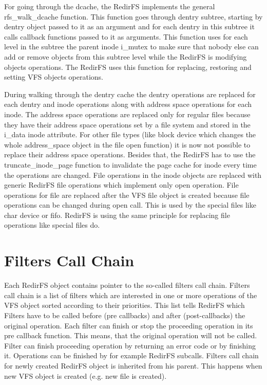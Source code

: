 \documentclass[oneside, 11pt, a4]{article}
\begin{document}
For going through the dcache, the RedirFS implements the general rfs\_walk\_dcache
function. This function goes through dentry subtree, starting by dentry object
passed to it as an argument and for each dentry in this subtree it calls
callback functions passed to it as arguments. This function uses for each level
in the subtree the parent inode i\_mutex to make sure that nobody else can add or
remove objects from this subtree level while the RedirFS is modifying objects
operations. The RedirFS uses this function for replacing, restoring and setting
VFS objects operations.

During walking through the dentry cache the dentry operations are replaced for
each dentry and inode operations along with address space operations for each
inode. The address space operations are replaced only for regular files because
they have their address space operations set by a file system and stored in the
i\_data inode attribute. For other file types (like block device which changes
the whole address\_space object in the file open function) it is now not possible
to replace their address space operations. Besides that, the RedirFS has to use
the truncate\_inode\_page function to invalidate the page cache for inode every
time the operations are changed. File operations in the inode objects are
replaced with generic RedirFS file operations which implement only open
operation. File operations for file are replaced after the VFS file object is
created because file operations can be changed during open call. This is used by
the special files like char device or fifo. RedirFS is using the same principle
for replacing file operations like special files do.

\section{Filters Call Chain}
Each RedirFS object contains pointer to the so-called filters call chain.
Filters call chain is a list of filters which are interested in one or more
operations of the VFS object sorted according to their priorities. This list
tells RedirFS which Filters have to be called before (pre callbacks) and after
(post-callbacks) the original operation. Each filter can finish or stop the
proceeding operation in its pre callback function. This means, that the original
operation will not be called. Filter can finish proceeding operation by
returning an error code or by finishing it. Operations can be finished by for
example RedirFS subcalls. Filters call chain for newly created RedirFS object is
inherited from his parent. This happens when new VFS object is created (e.g. new
file is created).
\end{document}
